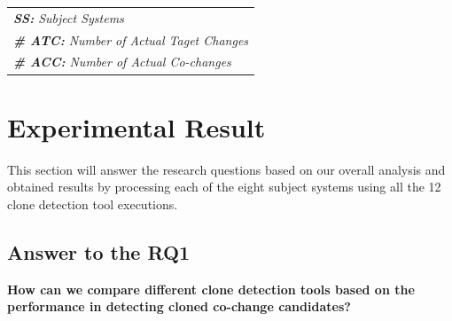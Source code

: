 \documentclass[review]{elsarticle}
\begin{document}
\begin{table}[htbp]
\begin{tabular}{lcccc}
\multicolumn{5}{l}{\textit{\textbf{SS:} Subject Systems}}                                                                                                                                         \\
\multicolumn{5}{l}{\textit{\textbf{\# ATC:} Number of   Actual Taget Changes}}                                                                                                                   \\
\multicolumn{5}{l}{\textit{\textbf{\# ACC:} Number of   Actual Co-changes}}                                                                                                                     
\end{tabular}
\end{table}

\section{Experimental Result}
\label{the-experimental-result}
This section will answer the research questions based on our overall analysis and obtained results by processing each of the eight subject systems using all the 12 clone detection tool executions. 

\subsection{Answer to the \textbf{RQ1}}
\textbf{How can we compare different clone detection tools based on the performance in detecting cloned co-change candidates?}
\end{document}
